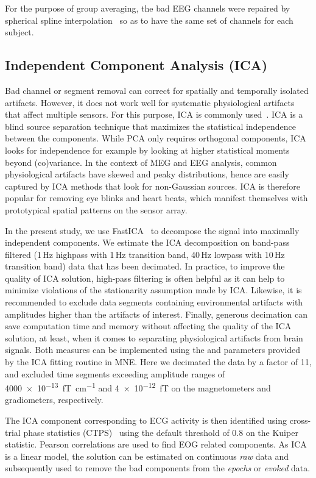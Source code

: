 For the purpose of group averaging, the bad EEG channels were repaired by spherical spline interpolation~\citep{perrin1989spherical} so as to have the same set of channels for each subject.

\subsection{Independent Component Analysis (ICA)}
 
Bad channel or segment removal can correct for spatially and temporally isolated artifacts. However, it does not work well for systematic physiological artifacts that affect multiple sensors. For this purpose, ICA is commonly used~\citep{jung1998extended}. ICA is a blind source separation technique that maximizes the statistical independence between the components. While PCA only requires orthogonal components, ICA looks for independence for example by looking at higher statistical moments beyond (co)variance. In the context of MEG and EEG analysis, common physiological artifacts have skewed and peaky distributions, hence are easily captured by ICA methods that look for non-Gaussian sources. ICA is therefore popular for removing eye blinks and heart beats, which manifest themselves with prototypical spatial patterns on the sensor array.

In the present study, we use FastICA~\citep{hyvarinen1999fast} to decompose the signal into maximally independent components. We estimate the ICA decomposition on band-pass filtered (1\,Hz highpass with 1\,Hz transition band, 40\,Hz lowpass with 10\,Hz transition band) data that has been decimated. In practice, to improve the quality of ICA solution, high-pass filtering is often helpful as it can help to minimize violations of the stationarity assumption made by ICA. Likewise, it is recommended to exclude data segments containing environmental artifacts with amplitudes higher than the artifacts of interest. Finally, generous decimation can save computation time and memory without affecting the quality of the ICA solution, at least, when it comes to separating physiological artifacts from brain signals. Both measures can be implemented using the  and  parameters provided by the ICA fitting routine in MNE. Here we decimated the data by a factor of 11, and excluded time segments exceeding amplitude ranges of \SI{4000e-13} {\femto\tesla\per\centi\meter} and \SI{4e-12} {\femto\tesla} on the magnetometers and gradiometers, respectively.

The ICA component corresponding to ECG activity is then identified using cross-trial phase statistics (CTPS)~\citep{dammers2008integration} using the default threshold of 0.8 on the Kuiper statistic. Pearson correlations are used to find EOG related components. As ICA is a linear model, the solution can be estimated on continuous \textit{raw} data and subsequently used to remove the bad components from the \textit{epochs} or \textit{evoked} data. 

